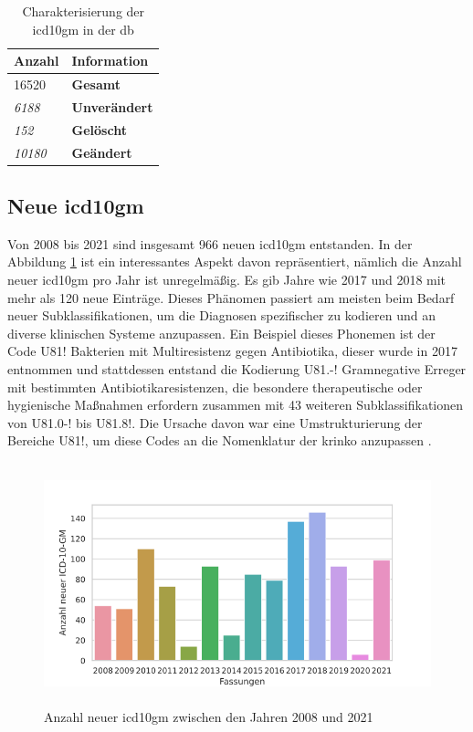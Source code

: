  \begin{table}[ht]
 	\centering
 	\small
 	\caption[\acs{icd10gm} in der \acs{db}]{Charakterisierung der \acs{icd10gm} in der \ac{db}}
 	\label{tab:icddb}
 	\begin{tabular}{|l|l|}
 		\hline
 		\rowcolor{lightgray}	Anzahl & Information \\ \hline 
 		16520 & \textbf{Gesamt} \\ \hline
 		\hline
 		\textit{6188} & \textbf{Unverändert} \\ \hline
 		\textit{152} & \textbf{Gelöscht} \\ \hline
 		\textit{10180} & \textbf{Geändert} \\ \hline
 	\end{tabular}
 \end{table}

\newpage

\subsection{Neue \acs{icd10gm}} \label{newicd}

Von 2008 bis 2021 sind insgesamt \textsf{966} neuen \ac{icd10gm} entstanden. In der Abbildung \ref{fig:newicdyear} ist ein interessantes Aspekt davon repräsentiert, nämlich die Anzahl neuer \ac{icd10gm} pro Jahr ist unregelmäßig. Es gib Jahre wie 2017 und 2018 mit mehr als \textsf{120} neue Einträge. Dieses Phänomen passiert am meisten beim Bedarf neuer Subklassifikationen, um die Diagnosen spezifischer zu kodieren und an diverse klinischen Systeme anzupassen. Ein Beispiel dieses Phonemen ist der Code \textsf{U81!} \textsf{Bakterien mit Multiresistenz gegen Antibiotika}, dieser wurde in 2017 entnommen und stattdessen entstand die Kodierung \textsf{U81.-!} \textsf{Gramnegative Erreger mit bestimmten Antibiotikaresistenzen, die besondere therapeutische oder hygienische Maßnahmen erfordern} zusammen mit \textsf{43} weiteren Subklassifikationen von \textsf{U81.0-!} bis \textsf{U81.8!}. Die Ursache davon war eine Umstrukturierung der Bereiche \textsf{U81!}, um diese Codes an die Nomenklatur der \ac{krinko} anzupassen \cite{erreg17}.

\begin{figure}[ht]
	\centering
	\includegraphics[height=7cm]{figures/newicdyear}
	\caption[Neue \acs{icd10gm} pro Jahr]{Anzahl neuer \acs{icd10gm} zwischen den Jahren 2008 und 2021}
	\label{fig:newicdyear}
\end{figure} 

